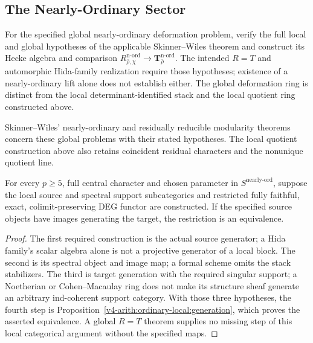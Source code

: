 \subsection{The Nearly-Ordinary Sector}

\begin{conjecture}
\label{v4-arith:w6-e:lem:SW-nearly-ord}
For the specified global nearly-ordinary deformation problem,
verify the full local and global hypotheses of the applicable
Skinner--Wiles theorem and construct its Hecke algebra and comparison
$R^{\mathrm{n\text{-}ord}}_{\bar\rho,\chi}\to
\mathbf T^{\mathrm{n\text{-}ord}}_{\bar\rho}$.
The intended $R=T$ and automorphic Hida-family realization require
those hypotheses; existence of a nearly-ordinary lift alone does
not establish either. The global deformation ring is distinct from
the local determinant-identified stack and the local quotient ring
constructed above.
\end{conjecture}
Skinner--Wiles' nearly-ordinary and residually reducible modularity
theorems concern these global problems with their stated hypotheses.
The local quotient construction above also retains coincident
residual characters and the nonunique quotient line.

\begin{theorem}
\label{v4-arith:w6-e:thm:TW-removal-nearly-ord}
For every $p\ge5$, full central character and chosen parameter in
$S^{\mathrm{nearly\text{-}ord}}$, suppose the local source and
spectral support subcategories and restricted fully faithful,
exact, colimit-preserving DEG functor are constructed. If the
specified source objects have images generating the target, the
restriction is an equivalence.
\end{theorem}
\begin{proof}
The first required construction is the actual source generator;
a Hida family's scalar algebra alone is not a projective generator
of a local block. The second is its spectral object and image map;
a formal scheme omits the stack stabilizers. The third is target
generation with the required singular support; a Noetherian or
Cohen--Macaulay ring does not make its structure sheaf generate an
arbitrary ind-coherent support category. With those three hypotheses,
the fourth step is
Proposition~\ref{v4-arith:ordinary-local:generation}, which proves
the asserted equivalence. A global $R=T$ theorem supplies no missing
step of this local categorical argument without the specified maps.
\end{proof}

